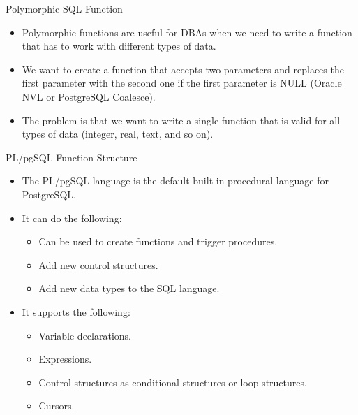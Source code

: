 \documentclass[aspectratio=169]{beamer}
\begin{document}
\begin{frame}{Polymorphic SQL Function}
  \begin{itemize}
    \item Polymorphic functions are useful for DBAs when we need to write a function that has to work with different types of data.
    \item We want to create a function that accepts two parameters and replaces the first parameter with the second one if the first parameter is NULL (Oracle NVL or PostgreSQL Coalesce).
    \item The problem is that we want to write a single function that is valid for all types of data (integer, real, text, and so on).
  \end{itemize}

\end{frame}


\begin{frame}{PL/pgSQL Function Structure}
  \begin{itemize}
    \item The PL/pgSQL language is the default built-in procedural language for PostgreSQL.
    \item It can do the following:
    \begin{itemize}
      \item Can be used to create functions and trigger procedures.
      \item Add new control structures.
      \item Add new data types to the SQL language.
    \end{itemize}
    \item It supports the following:
    \begin{itemize}
      \item Variable declarations.
      \item Expressions.
      \item Control structures as conditional structures or loop structures.
      \item Cursors.
    \end{itemize}
  \end{itemize}
\end{frame}
\end{document}
